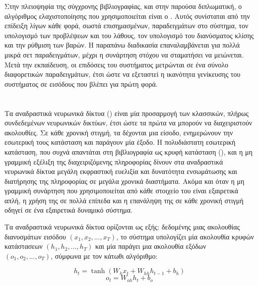 Στην πλειοψηφία της σύγχρονης βιβλιογραφίας, και στην παρούσα διπλωματική, ο αλγόριθμος ελαχιστοποίησης που χρησιμοποιείται είναι ο .
Αυτός συνίσταται από την επίδειξη λίγων κάθε φορά, σωστά επισημασμένων, παραδειγμάτων στο σύστημα, τον υπολογισμό των προβλέψεων και του λάθους, τον υπολογισμό του διανύσματος κλίσης και την ρύθμιση των βαρών.
Η παραπάνω διαδικασία επαναλαμβάνεται για πολλά μικρά σετ παραδειγμάτων, μέχρι η συνάρτηση στόχου να σταματήσει να μειώνεται.
Μετά την εκπαίδευση, οι επιδόσεις του συστήματος μετρώνται σε ένα σύνολο διαφορετικών παραδειγμάτων, έτσι ώστε να εξεταστεί η ικανότητα γενίκευσης του συστήματος σε εισόδους που βλέπει για πρώτη φορά.
 
\section{}

Τα αναδραστικά νευρωνικά δίκτυα () είναι μία προσαρμογή των κλασσικών, πλήρως συνδεδεμένων νευρωνικών δικτύων, έτσι ώστε τα πρώτα να μπορούν να διαχειριστούν ακολουθίες. 
Σε κάθε χρονική στιγμή, τα  δέχονται μια είσοδο, ενημερώνουν την εσωτερική τους κατάσταση και παράγουν μία έξοδο.
Η πολυδιάστατη εσωτερική κατάσταση, που συχνά απαντάται στη βιβλιογραφία ως κρυφή κατάσταση (), και η μη γραμμική εξέλιξη της διαχειριζόμενης πληροφορίας δίνουν στα αναδραστικά νευρωνικά δίκτυα μεγάλη εκφραστική ευελιξία και δυνατότητα ενσωμάτωσης και διατήρησης της πληροφορίας σε μεγάλα χρονικά διαστήματα.
Ακόμα και όταν η μη γραμμική συνάρτηση που χρησιμοποιείται από κάθε στοιχείο του  είναι εξαιρετικά απλή, η χρήση της σε πολλά επίπεδα και η επανάληψη της σε κάθε χρονική στιγμή οδηγεί σε ένα εξαιρετικά δυναμικό σύστημα. 

Τα αναδραστικά νευρωνικά δίκτυα ορίζονται ως εξής: δεδομένης μιας ακολουθίας διανυσμάτων εισόδου $(x_1, x_2, ..., x_T)$, το σύστημα υπολογίζει μία ακολουθία κρυφών κατάστασεων $(h_1, h_2, ..., h_T)$ και μία παράγει μια ακολουθία εξόδων $(ο_1, ο_2, ..., ο_T)$, σύμφωνα με τον κάτωθι αλγόριθμο:


\begin{algorithm}
\caption{}
\begin{algorithmic}
\STATE \begin{equation}
h_t = \tanh(W_h x_t + W_{hh} h_{t-1} + b_h)\label{eq:h}
\end{equation}
\STATE \begin{equation}
o_t = W_{oh} h_t + b_o
\end{equation}
\ENDFOR
\end{algorithmic}
\end{algorithm}

